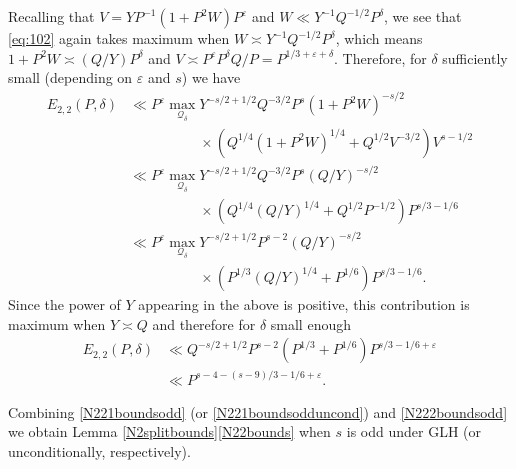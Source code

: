 \documentclass[letterpaper,11pt]{amsart}
\numberwithin{equation}{section}
\theoremstyle{definition}
\numberwithin{equation}{section}
\newcommand{\ve}{\varepsilon}
\begin{document}
Recalling that $V=YP^{-1} (1+P^2W)P^\ve$ and $W\ll Y^{-1}Q^{-1/2}P^\delta$, we see that \eqref{eq:102} again takes maximum when $W\asymp Y^{-1}Q^{-1/2}P^\delta$, which means $1+P^2W\asymp (Q/Y)P^\delta$ and $V\asymp P^\ve P^\delta Q/P=P^{1/3+\ve+\delta}$. Therefore, for $\delta$ sufficiently small (depending on $\ve$ and $s$) we have 
\begin{align*}
E_{2,2}(P, \delta)&\ll P^{\ve} \max_{\mathcal Q_\delta}Y^{-s/2+1/2}Q^{-3/2} P^{s}(1+P^2W)^{-s/2}\\& \quad \quad \quad\quad \quad \times (Q^{1/4}(1+P^2W)^{1/4}+Q^{1/2}V^{-3/2})V^{s-1/2}\\&\ll P^{\ve} \max_{\mathcal Q_\delta}Y^{-s/2+1/2}Q^{-3/2} P^{s}(Q/Y)^{-s/2}\\& \quad \quad \quad\quad \quad \times (Q^{1/4}(Q/Y)^{1/4}+Q^{1/2}P^{-1/2})P^{s/3-1/6}\\
&\ll P^{\ve}\max_{\mathcal Q_\delta}Y^{-s/2+1/2} P^{s-2}(Q/Y)^{-s/2}\\& \quad \quad \quad\quad \quad \times (P^{1/3}(Q/Y)^{1/4}+P^{1/6})P^{s/3-1/6}.
\end{align*}
Since the power of $Y$ appearing in the above is positive, this contribution is maximum when $Y\asymp Q$ and therefore for $\delta$ small enough
\begin{align}
 E_{2,2}(P, \delta)   & \ll \nonumber
 Q^{-s/2+1/2} P^{s-2}(P^{1/3}+P^{1/6})P^{s/3-1/6+\ve}\\&\ll  P^{s-4-(s-9)/3-1/6+\ve }.\label{N222boundsodd}
\end{align}

Combining \eqref{N221boundsodd} (or \eqref{N221boundsodduncond}) and \eqref{N222boundsodd} we obtain Lemma \ref{N2splitbounds}\eqref{N22bounds} when $s$ is odd under GLH (or unconditionally, respectively). 
\end{document}
